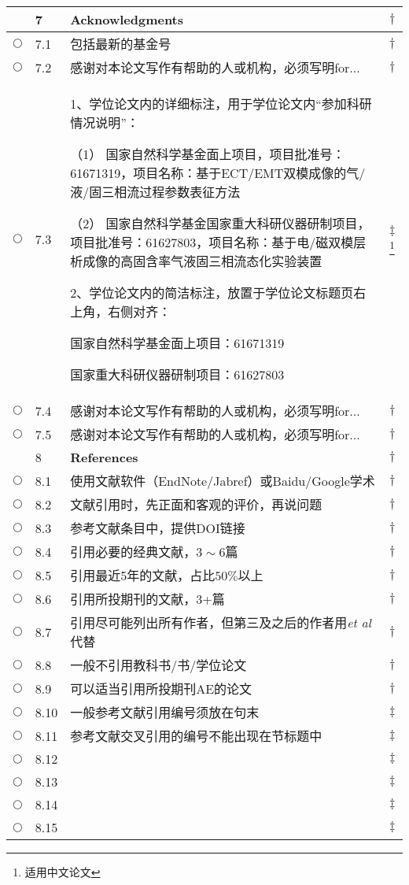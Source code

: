 \documentclass{ctexart}
\begin{document}
\begin{center}
\begin{longtable}{|l|l|p{}|l|}
 & 7 & \textcolor[rgb]{0.00,0.00,1.00}{\textbf{Acknowledgments}}& $\dagger$\\\hline
$\bigcirc$& 7.1 & 包括最新的基金号 & $\dagger$\\\hline
$\bigcirc$& 7.2 & 感谢对本论文写作有帮助的人或机构，必须写明for... & $\dagger$\\\hline
$\bigcirc$& 7.3 & 1、学位论文内的详细标注，用于学位论文内“参加科研情况说明”：

（1）	国家自然科学基金面上项目，项目批准号：61671319，项目名称：基于ECT/EMT双模成像的气/液/固三相流过程参数表征方法

（2）	国家自然科学基金国家重大科研仪器研制项目，项目批准号：61627803，项目名称：基于电/磁双模层析成像的高固含率气液固三相流态化实验装置

2、学位论文内的简洁标注，放置于学位论文标题页右上角，右侧对齐：

国家自然科学基金面上项目：61671319

国家重大科研仪器研制项目：61627803 & $\ddagger$\footnote{适用中文论文}\\\hline
$\bigcirc$& 7.4 & 感谢对本论文写作有帮助的人或机构，必须写明for... & $\dagger$\\\hline
$\bigcirc$& 7.5 & 感谢对本论文写作有帮助的人或机构，必须写明for... & $\dagger$\\\hline
\hline

& 8 & \textcolor[rgb]{0.00,0.00,1.00}{\textbf{References}}& $\dagger$\\\hline
$\bigcirc$& 8.1 & 使用文献软件（EndNote/Jabref）或Baidu/Google学术 & $\dagger$\\\hline
$\bigcirc$& 8.2 & 文献引用时，先正面和客观的评价，再说问题& $\dagger$\\\hline
$\bigcirc$& 8.3 & 参考文献条目中，提供DOI链接& $\dagger$\\\hline
$\bigcirc$& 8.4 & 引用必要的经典文献，$3\sim6$篇& $\dagger$\\\hline
$\bigcirc$& 8.5 & 引用最近5年的文献，占比$50\%$以上& $\dagger$\\\hline
$\bigcirc$& 8.6 & 引用所投期刊的文献，3+篇& $\dagger$\\\hline
$\bigcirc$& 8.7 & 引用尽可能列出所有作者，但第三及之后的作者用\emph{et al}代替& $\dagger$\\\hline
$\bigcirc$& 8.8 & 一般不引用教科书/书/学位论文& $\dagger$\\\hline
$\bigcirc$& 8.9 & 可以适当引用所投期刊AE的论文& $\dagger$\\\hline
$\bigcirc$& 8.10 & 一般参考文献引用编号须放在句末 & $\ddagger$\\\hline
$\bigcirc$& 8.11 & 参考文献交叉引用的编号不能出现在节标题中& $\ddagger$\\\hline
$\bigcirc$& 8.12 & & $\ddagger$\\\hline
$\bigcirc$& 8.13 & & $\ddagger$\\\hline
$\bigcirc$& 8.14 & & $\ddagger$\\\hline
$\bigcirc$& 8.15 & & $\ddagger$\\\hline
\hline


\end{longtable}
\end{center}
\end{document}
